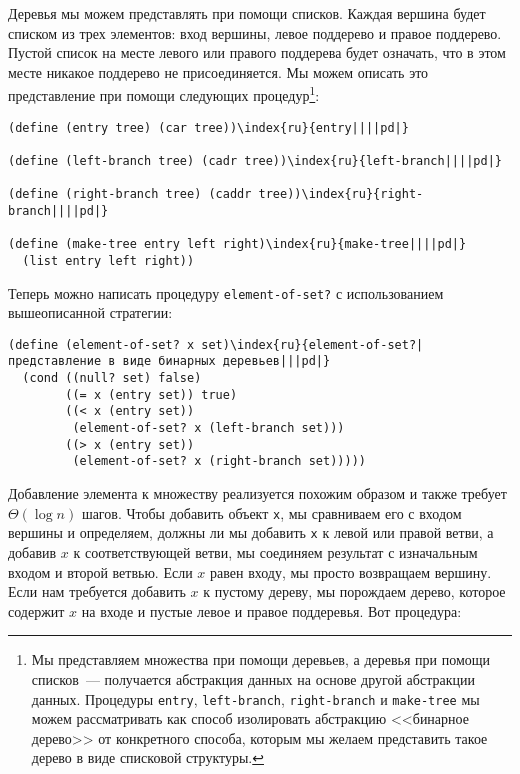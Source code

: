 Деревья мы можем представлять при помощи
списков.  Каждая вершина будет списком из трех элементов: вход
вершины, левое поддерево и правое поддерево.  Пустой список на месте
левого или правого поддерева будет означать, что в этом месте никакое
поддерево не присоединяется.  Мы можем описать это представление при
помощи следующих процедур\footnote{Мы представляем множества при помощи деревьев, а
деревья при помощи списков~--- получается абстракция данных на основе
другой абстракции данных.  Процедуры {\tt entry},
{\tt left-branch}, {\tt right-branch} и
{\tt make-tree} мы можем рассматривать как способ изолировать
абстракцию <<бинарное дерево>> от конкретного способа, которым мы
желаем представить такое дерево в виде списковой структуры.}:

\begin{Verbatim}[fontsize=\small]
(define (entry tree) (car tree))\index{ru}{entry||||pd|}

(define (left-branch tree) (cadr tree))\index{ru}{left-branch||||pd|}

(define (right-branch tree) (caddr tree))\index{ru}{right-branch||||pd|}

(define (make-tree entry left right)\index{ru}{make-tree||||pd|}
  (list entry left right))
\end{Verbatim}

Теперь можно написать процедуру
{\tt element-of-set?} с использованием вышеописанной стратегии: 

\begin{Verbatim}[fontsize=\small]
(define (element-of-set? x set)\index{ru}{element-of-set?|представление в виде бинарных деревьев|||pd|}
  (cond ((null? set) false)
        ((= x (entry set)) true)
        ((< x (entry set))
         (element-of-set? x (left-branch set)))
        ((> x (entry set))
         (element-of-set? x (right-branch set)))))
\end{Verbatim}

Добавление элемента к множеству реализуется похожим
образом и также требует $\Theta (\log n)$ шагов.  Чтобы
добавить объект {\tt x}, мы сравниваем его с входом вершины
и определяем, должны ли мы добавить {\tt x} к левой или
правой ветви, а добавив $x$ к соответствующей ветви, мы
соединяем результат с изначальным входом и второй ветвью.  Если
$x$ равен входу, мы просто возвращаем вершину.  Если нам
требуется добавить $x$ к пустому дереву, мы порождаем
дерево, которое содержит $x$ на входе и пустые левое и
правое поддеревья.  Вот процедура:

